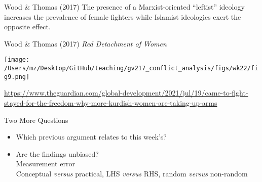 \documentclass[handout]{beamer}
\begin{document}
\begin{frame}{Wood \& Thomas (2017)}
    \pause The presence of a Marxist-oriented ``leftist'' ideology increases the prevalence of female fighters while Islamist ideologies exert the opposite effect.
\end{frame}

\begin{frame}{Wood \& Thomas (2017)}
    \pause \textit{Red Detachment of Women}
    \begin{center}
        \texttt{[image: /Users/mz/Desktop/GitHub/teaching/gv217\_conflict\_analysis/figs/wk22/fig9.png]}
    \end{center}
    \tiny \url{https://www.theguardian.com/global-development/2021/jul/19/came-to-fight-stayed-for-the-freedom-why-more-kurdish-women-are-taking-up-arms}
\end{frame}

\begin{frame}{Two More Questions}
    \begin{itemize}
        \pause\item Which previous argument relates to this week's?
        \pause\item Are the findings unbiased?\\
        \pause      Measurement error\\
        \pause      Conceptual \textit{versus} practical, LHS \textit{versus} RHS, random \textit{versus} non-random
    \end{itemize}
\end{frame}
\end{document}
